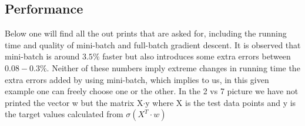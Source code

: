 \documentclass[paper=a4, fontsize=11pt]{scrartcl} %
\numberwithin{equation}{section} %
\numberwithin{figure}{section} %
\numberwithin{table}{section} %
\begin{document}
\subsection*{Performance}
Below one will find all the out prints that are asked for, including the running time and quality of mini-batch and full-batch gradient descent. It is observed that mini-batch is around $3.5\%$ faster but also introduces some extra errors between $0.08-0.3\%$. Neither of these numbers imply extreme changes in running time the extra errors added by using mini-batch, which implies to us, in this given example one can freely choose one or the other. In the 2 vs 7 picture we have not printed the vector w but the matrix X$\cdot$y where X is the test data points and y is the target values calculated from $\sigma(X^T\cdot w)$
\\ \\
\end{document}
